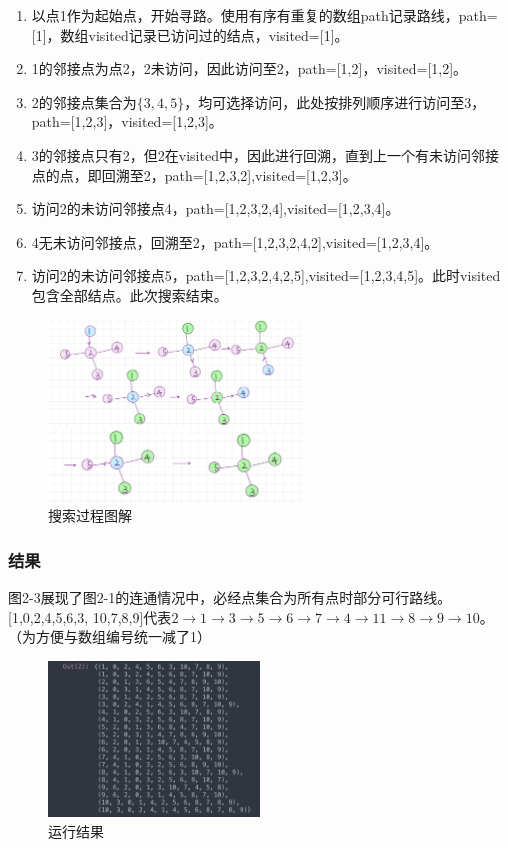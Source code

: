 \documentclass[12pt]{article}
\begin{document}
\begin{enumerate}
\renewcommand{\labelenumi}{(\theenumi)}
\item 以点1作为起始点，开始寻路。使用有序有重复的数组path记录路线，path=[1]，数组visited记录已访问过的结点，visited=[1]。
\item 1的邻接点为点2，2未访问，因此访问至2，path=[1,2]，visited=[1,2]。
\item2的邻接点集合为$\{3,4,5\}$，均可选择访问，此处按排列顺序进行访问至3，path=[1,2,3]，visited=[1,2,3]。
\item 3的邻接点只有2，但2在visited中，因此进行回溯，直到上一个有未访问邻接点的点，即回溯至2，path=[1,2,3,2],visited=[1,2,3]。
\item 访问2的未访问邻接点4，path=[1,2,3,2,4],visited=[1,2,3,4]。
\item 4无未访问邻接点，回溯至2，path=[1,2,3,2,4,2],visited=[1,2,3,4]。
\item 访问2的未访问邻接点5，path=[1,2,3,2,4,2,5],visited=[1,2,3,4,5]。此时visited包含全部结点。此次搜索结束。
\end{enumerate}
\begin{figure}
    \centering
    \includegraphics[width = 0.6\textwidth]{assets/dfs.JPG}
    \caption{\label{fig dfs.JPG}搜索过程图解}
\end{figure}
\subsubsection{结果}
图2-3展现了图2-1的连通情况中，必经点集合为所有点时部分可行路线。[1,0,2,4,5,6,3,
10,7,8,9]代表$2\rightarrow1\rightarrow3\rightarrow5\rightarrow6\rightarrow7\rightarrow4\rightarrow11\rightarrow8\rightarrow9\rightarrow10$。（为方便与数组编号统一减了1）
\begin{figure}[h]
    \centering
    \includegraphics[width = 0.5\textwidth]{assets/possibleways.jpeg}
    \caption{\label{fig possibleways.jpeg}运行结果}
\end{figure}
\end{document}
